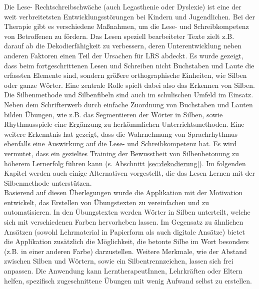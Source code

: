 Die Lese- Rechtschreibschwäche (auch Legasthenie oder Dyslexie) ist eine der weit verbreitetsten Entwicklungsstörungen bei Kindern und Jugendlichen\cite{Mayer2016}. Bei der Therapie gibt es verschiedene Maßnahmen, um die Lese- und Schreibkompetenz von Betroffenen zu fördern. Das Lesen speziell bearbeiteter Texte zielt z.B. darauf ab die Dekodierfähigkeit zu verbessern, deren Unterentwicklung neben anderen Faktoren einen Teil der Ursachen für LRS abdeckt\cite{Schulte-Koerne2014}. Es wurde gezeigt, dass beim fortgeschrittenen Lesen und Schreiben nicht Buchstaben und Laute die erfassten Elemente sind, sondern größere orthographische Einheiten, wie Silben oder ganze Wörter\cite{Steinbrink2014}. Eine zentrale Rolle spielt dabei also das Erkennen von Silben. Die Silbenmethode und Silbenfibeln sind auch im schulischen Umfeld im Einsatz. Neben dem Schrifterwerb durch einfache Zuordnung von Buchstaben und Lauten bilden Übungen, wie z.B. das Segmentieren der Wörter in Silben, sowie Rhythmusspiele eine Ergänzung zu herkömmlichen Unterrichtsmethoden\cite{Bredel2010}. Eine weitere Erkenntnis hat gezeigt, dass die Wahrnehmung von Sprachrhythmus ebenfalls eine Auswirkung auf die Lese- und Schreibkompetenz hat\cite{Brandelik2014}. Es wird vermutet, dass ein gezieltes Training der Bewusstheit von Silbenbetonung zu höherem Lernerfolg führen kann\cite{Holz2017} (s. Abschnitt \ref{sec:dekodierung}). Im folgenden Kapitel werden auch einige Alternativen vorgestellt, die das Lesen Lernen mit der Silbenmethode unterstützen.\\
Basierend auf diesen Überlegungen wurde die Applikation mit der Motivation entwickelt, das Erstellen von Übungstexten zu vereinfachen und zu automatisieren. In den Übungstexten werden Wörter in Silben unterteilt, welche sich mit verschiedenen Farben hervorheben lassen. Im Gegensatz zu ähnlichen Ansätzen (sowohl Lehrmaterial in Papierform als auch digitale Ansätze) bietet die Applikation zusätzlich die Möglichkeit, die betonte Silbe im Wort besonders (z.B. in einer anderen Farbe) darzustellen. Weitere Merkmale, wie der Abstand zwischen Silben und Wörtern, sowie ein Silbentrennzeichen, lassen sich frei anpassen. Die Anwendung kann LerntherapeutInnen, Lehrkräften oder Eltern helfen, spezifisch zugeschnittene Übungen mit wenig Aufwand selbst zu erstellen.\\

